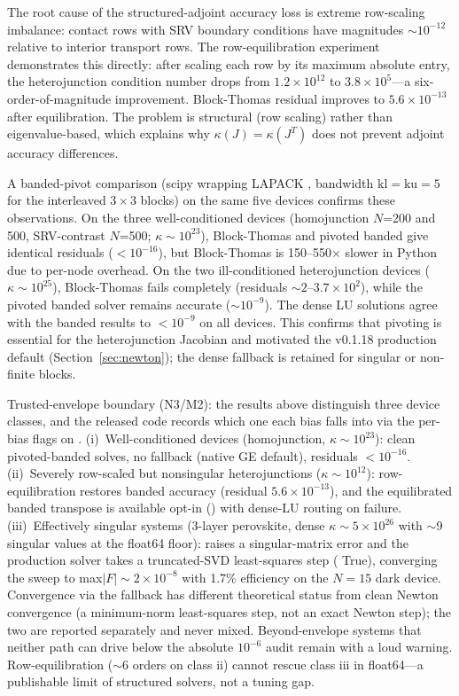 The root cause of the structured-adjoint accuracy loss is extreme
row-scaling imbalance: contact rows with SRV boundary conditions have
magnitudes $\sim10^{-12}$ relative to interior transport rows. The
row-equilibration experiment demonstrates this directly: after scaling
each row by its maximum absolute entry, the heterojunction condition
number drops from $1.2\times10^{12}$ to $3.8\times10^{5}$---a
six-order-of-magnitude improvement. Block-Thomas residual improves to
$5.6\times10^{-13}$ after equilibration. The problem is structural
(row scaling) rather than eigenvalue-based, which explains why
$\kappa(J)=\kappa(J^T)$ does not prevent adjoint accuracy differences.

A banded-pivot comparison (scipy  wrapping LAPACK
, bandwidth $\mathrm{kl}=\mathrm{ku}=5$ for the interleaved
$3\times3$ blocks) on the same five devices confirms these observations.
On the three well-conditioned devices (homojunction $N$=200 and 500,
SRV-contrast $N$=500; $\kappa\sim10^{23}$), Block-Thomas and pivoted
banded give identical residuals ($<10^{-16}$), but Block-Thomas is
150--550$\times$ slower in Python due to per-node overhead. On the two
ill-conditioned heterojunction devices ($\kappa\sim10^{25}$), Block-Thomas
fails completely (residuals $\sim2$--$3.7\times10^{2}$), while the
pivoted banded solver remains accurate ($\sim10^{-9}$). The dense LU
solutions agree with the banded results to $<10^{-9}$ on all devices.
This confirms that pivoting is essential for the heterojunction Jacobian
and motivated the v0.1.18 production default (Section~\ref{sec:newton});
the dense fallback is retained for singular or non-finite blocks.

Trusted-envelope boundary (N3/M2): the results above distinguish three
device classes, and the released code records which one each bias falls
into via the per-bias  flags on .
(i)~Well-conditioned devices (homojunction, $\kappa\sim10^{23}$): clean
pivoted-banded solves, no fallback (native GE default), residuals $<10^{-16}$. (ii)~Severely
row-scaled but nonsingular heterojunctions ($\kappa\sim10^{12}$):
row-equilibration restores banded accuracy (residual $5.6\times10^{-13}$),
and the equilibrated banded transpose is available opt-in
() with dense-LU routing on failure.
(iii)~Effectively singular systems (3-layer perovskite, dense
$\kappa\sim5\times10^{26}$ with $\sim$9 singular values at the float64
floor):  raises a singular-matrix error and the production
solver takes a truncated-SVD least-squares step (
True), converging the sweep to max$|F|\sim2\times10^{-8}$ with
1.7\% efficiency on the $N=15$ dark device. Convergence via the fallback
has different theoretical status from clean Newton convergence (a
minimum-norm least-squares step, not an exact Newton step); the two are
reported separately and never mixed. Beyond-envelope systems that neither
path can drive below the absolute $10^{-6}$ audit remain
 with a loud warning. Row-equilibration ($\sim$6
orders on class ii) cannot rescue class iii in float64---a publishable
limit of structured solvers, not a tuning gap.

